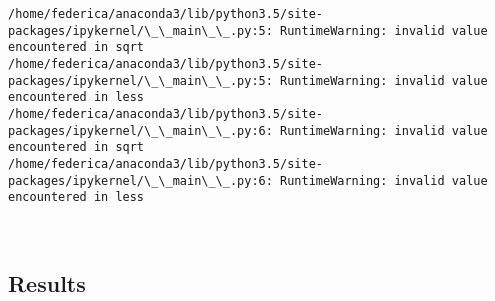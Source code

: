\documentclass[11pt]{article}
\begin{document}
    \begin{Verbatim}[commandchars=\\\{\}]
/home/federica/anaconda3/lib/python3.5/site-packages/ipykernel/\_\_main\_\_.py:5: RuntimeWarning: invalid value encountered in sqrt
/home/federica/anaconda3/lib/python3.5/site-packages/ipykernel/\_\_main\_\_.py:5: RuntimeWarning: invalid value encountered in less
/home/federica/anaconda3/lib/python3.5/site-packages/ipykernel/\_\_main\_\_.py:6: RuntimeWarning: invalid value encountered in sqrt
/home/federica/anaconda3/lib/python3.5/site-packages/ipykernel/\_\_main\_\_.py:6: RuntimeWarning: invalid value encountered in less

    \end{Verbatim}

    \begin{center}
    \end{center}
    { \hspace*{\fill} \\}
    
    \subsection{Results}\label{results}
\end{document}
